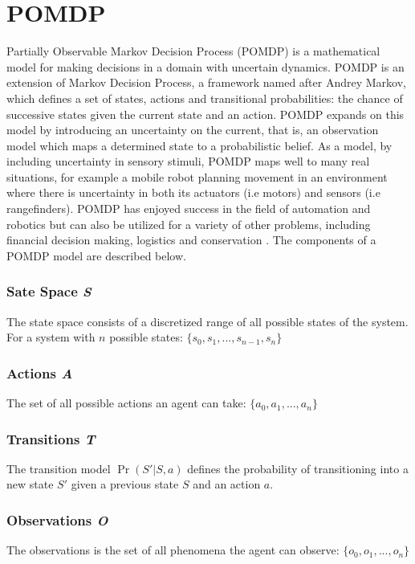 \documentclass[12pt,openany,a4paper]{book}
\begin{document}
\section{POMDP}
Partially Observable Markov Decision Process (POMDP) is a mathematical model for making decisions in a domain with uncertain dynamics. POMDP is an extension of Markov Decision Process, a framework named after Andrey Markov, which defines a set of states, actions and transitional probabilities: the chance of successive states given the current state and an action. POMDP expands on this model by introducing an uncertainty on the current, that is, an observation model which maps a determined state to a probabilistic belief.
As a model, by including uncertainty in sensory stimuli, POMDP maps well to many real situations, for example a mobile robot planning movement in an environment where there is uncertainty in both its actuators (i.e motors) and sensors (i.e rangefinders).
 POMDP has enjoyed success in the field of automation and robotics but can also be utilized for a variety of other problems, including financial decision making, logistics and conservation  \cite{pomdptigers}.
The components of a POMDP model are described below.

\subsubsection*{Sate Space \emph{S}}
\noindent The state space consists of a discretized range of all possible states of the system. 
\\
For a system with \ensuremath{n} possible states: 
\ensuremath{ \{ s_{0}, s_{1}, ... ,s_{n-1}, s_{n} \} } 

\subsubsection*{Actions \emph{A}}
\noindent The set of all possible actions an agent can take:
\ensuremath{ \{ a_{0},a_{1}, ... ,a_{n} \} } 


\subsubsection*{Transitions \emph{T}}
\noindent The transition model \ensuremath{\Pr(S' | S,a)} defines the probability of transitioning into a new state \ensuremath{S'} given a previous state \ensuremath{S} and an action \ensuremath{a}.

\subsubsection*{Observations \emph{O}}
\noindent The observations is the set of all phenomena the agent can observe:
\ensuremath{ \{ o_{0},o_{1}, ... ,o_{n} \} } 
\end{document}
